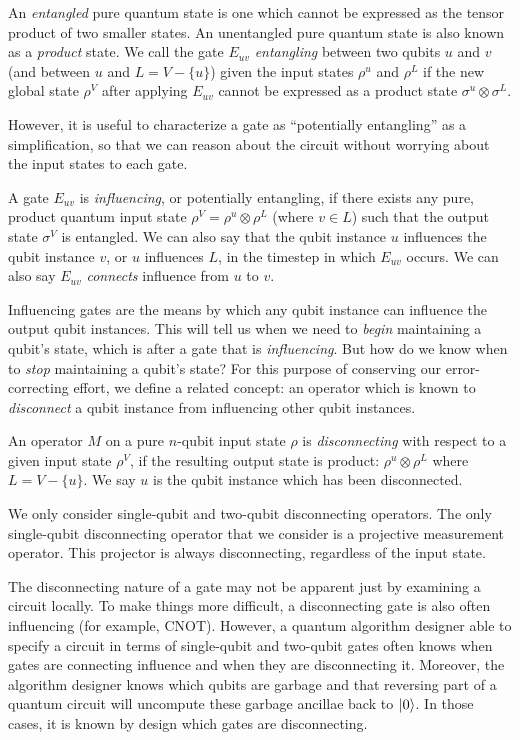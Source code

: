 An \emph{entangled} pure quantum state is one which cannot be expressed as the
tensor product of two smaller states. An unentangled pure quantum state
is also known as a \emph{product} state. 
We call the gate $E_{uv}$ \emph{entangling} between two qubits $u$ and $v$
(and between $u$ and $L = V - \{u\}$) given the input states $\rho^{u}$ and $\rho^{L}$ if
the new global state $\rho^{V}$ after applying $E_{uv}$ cannot be expressed as a product state
$\sigma^{u} \otimes \sigma^{L}$.

However, it is useful to characterize a gate as ``potentially entangling''
as a simplification, so that we can reason about the circuit without
worrying about the input states to each gate.
%
\begin{definition}
A gate $E_{uv}$ is \emph{influencing}, or potentially entangling, if
there exists any pure, product quantum input state $\rho^{V} = \rho^{u} \otimes \rho^{L}$
(where $v \in L$) such that the output state $\sigma^{V}$ is entangled.
We can also say that the qubit instance $u$ influences
the qubit instance $v$, or $u$ influences
$L$, in the timestep in which $E_{uv}$ occurs.
We can also say $E_{uv}$ \emph{connects} influence from $u$ to $v$.
\end{definition}

Influencing gates are the means by which any qubit instance can influence
the output qubit instances. This will tell us when we need to \emph{begin}
maintaining a qubit's state, which is after a gate that is
\emph{influencing}.
But how do we know when to \emph{stop} maintaining a qubit's state?
For this purpose of conserving our error-correcting effort, we define
a related concept: an operator which is known to \emph{disconnect}
a qubit instance from influencing other qubit instances.

\begin{definition}
An operator $M$ on a pure $n$-qubit input state $\rho$ is 
\emph{disconnecting} with respect to a given input state $\rho^{V}$,
if the resulting output state is product:
$\rho^{u} \otimes \rho^{L}$ where $L = V - \{u\}$.
We say $u$ is the
qubit instance which has been disconnected.
\end{definition}

We only consider single-qubit and two-qubit disconnecting operators.
The only single-qubit disconnecting operator that we consider
is a projective measurement operator. This projector is always disconnecting,
regardless of the input state.

The disconnecting nature of a gate
may not be apparent just by examining a circuit locally.
To make things more difficult, a disconnecting gate is also often
influencing (for example, CNOT).
However, a quantum algorithm designer able to specify a circuit in terms of
single-qubit and
two-qubit gates often knows when gates are connecting influence and when
they are disconnecting it.
Moreover, the algorithm designer knows which qubits are garbage and that reversing
part of a quantum circuit will uncompute these garbage ancillae back to $\left\vert{0}\right\rangle$.
In those cases, it is known by design which gates are disconnecting.

